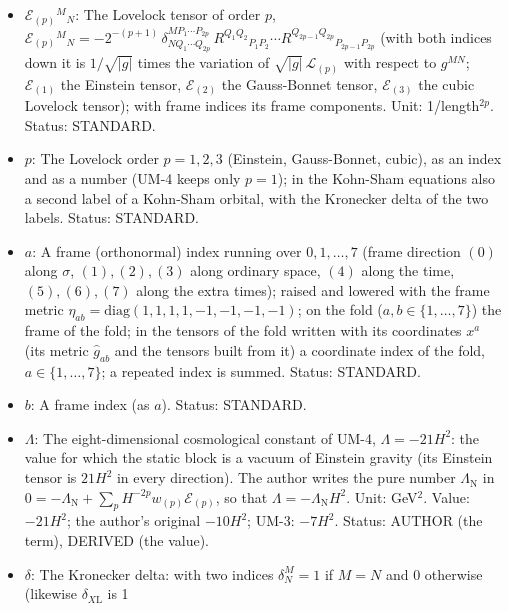 \documentclass[
  10pt,
]{article}
\providecommand{\tightlist}{%
  \setlength{\itemsep}{0pt}\setlength{\parskip}{0pt}}
\begin{document}
\begin{itemize}
\tightlist
\item
  \(\mathcal{E}_{(p)}{}^M{}_N\): The Lovelock tensor of order \(p\),
  \(\mathcal{E}_{(p)}{}^M{}_N = -2^{-(p+1)}\,\delta^{MP_1\cdots P_{2p}}_{NQ_1\cdots Q_{2p}}\,R^{Q_1Q_2}{}_{P_1P_2}\cdots R^{Q_{2p-1}Q_{2p}}{}_{P_{2p-1}P_{2p}}\)
  (with both indices down it is \(1/\sqrt{\lvert g\rvert}\) times the
  variation of \(\sqrt{\lvert g\rvert}\,\mathcal{L}_{(p)}\) with respect
  to \(g^{MN}\); \(\mathcal{E}_{(1)}\) the Einstein tensor,
  \(\mathcal{E}_{(2)}\) the Gauss-Bonnet tensor, \(\mathcal{E}_{(3)}\)
  the cubic Lovelock tensor); with frame indices its frame components.
  Unit: 1/length\(^{2p}\). Status: STANDARD.
\item
  \(p\): The Lovelock order \(p = 1, 2, 3\) (Einstein, Gauss-Bonnet,
  cubic), as an index and as a number (UM-4 keeps only \(p = 1\)); in
  the Kohn-Sham equations also a second label of a Kohn-Sham orbital,
  with the Kronecker delta of the two labels. Status: STANDARD.
\item
  \(a\): A frame (orthonormal) index running over \(0, 1, \dots, 7\)
  (frame direction \((0)\) along \(\sigma\), \((1), (2), (3)\) along
  ordinary space, \((4)\) along the time, \((5), (6), (7)\) along the
  extra times); raised and lowered with the frame metric
  \(\eta_{ab} = \mathrm{diag}(1, 1, 1, 1, -1, -1, -1, -1)\); on the fold
  (\(a, b \in \{1, \dots, 7\}\)) the frame of the fold; in the tensors
  of the fold written with its coordinates \(x^a\) (its metric
  \(\hat g_{ab}\) and the tensors built from it) a coordinate index of
  the fold, \(a \in \{1, \dots, 7\}\); a repeated index is summed.
  Status: STANDARD.
\item
  \(b\): A frame index (as \(a\)). Status: STANDARD.
\item
  \(\Lambda\): The eight-dimensional cosmological constant of UM-4,
  \(\Lambda = -21H^2\): the value for which the static block is a vacuum
  of Einstein gravity (its Einstein tensor is \(21H^2\) in every
  direction). The author writes the pure number \(\Lambda_{\mathrm{N}}\)
  in
  \(0 = -\Lambda_{\mathrm{N}} + \sum_p H^{-2p}w_{(p)}\mathcal{E}_{(p)}\),
  so that \(\Lambda = -\Lambda_{\mathrm{N}}H^2\). Unit: GeV\(^2\).
  Value: \(-21H^2\); the author's original \(-10H^2\); UM-3: \(-7H^2\).
  Status: AUTHOR (the term), DERIVED (the value).
\item
  \(\delta\): The Kronecker delta: with two indices \(\delta^M_N = 1\)
  if \(M = N\) and 0 otherwise (likewise \(\delta_{X\mathrm{L}}\) is 1

\end{itemize}
\end{document}
